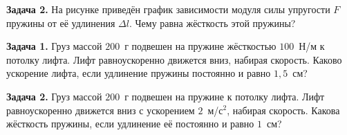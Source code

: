 \begin{taskbasic}[code={\label{task:elastic_v12_n2}}]
\textbf{Задача 2.} На рисунке приведён график зависимости модуля силы упругости $F$ пружины от её удлинения $\Delta l$. Чему равна жёсткость этой пружины?

\nopagebreak\smallskip
\begin{center}
\end{center}

\end{taskbasic}


\begin{taskbasic}[code={\label{task:elastic_v27_n22}}]
\textbf{Задача 1.} Груз массой $200$~г подвешен на пружине жёсткостью $100$~Н/м к потолку лифта. Лифт равноускоренно движется вниз, набирая скорость. Каково ускорение лифта, если удлинение пружины постоянно и равно $1{,}5$~см?

\end{taskbasic}

\begin{taskbasic}[code={\label{task:elastic_v28_n22}}]
\textbf{Задача 2.} Груз массой $200$~г подвешен на пружине к потолку лифта. Лифт равноускоренно движется вниз с ускорением $2$~м/с$^{2}$, набирая скорость. Какова жёсткость пружины, если удлинение её постоянно и равно $1$~см?

\end{taskbasic}

